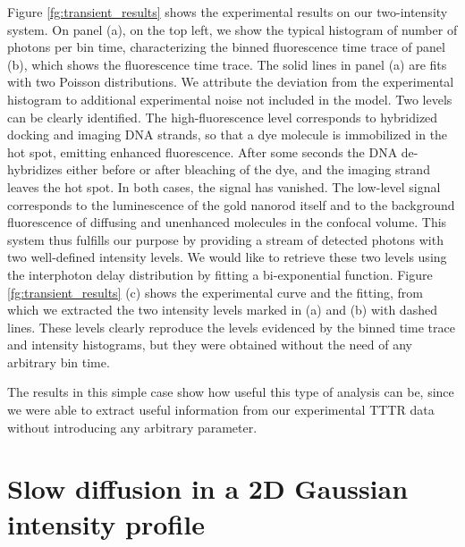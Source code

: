 Figure \ref{fg:transient_results} shows the experimental results
 on our two-intensity system. On panel (a), on the top left, we 
show the typical histogram of number of photons per bin time, 
characterizing the binned fluorescence time trace of panel (b), 
which shows the fluorescence time trace. The solid lines in panel (a) 
are fits with two Poisson distributions. We attribute the deviation 
from the experimental histogram to additional experimental noise not 
included in the model. Two levels can be clearly identified. The high-fluorescence 
level corresponds to hybridized docking and imaging DNA strands, so 
that a dye molecule is immobilized in the hot spot, emitting enhanced 
fluorescence. After some seconds the DNA de-hybridizes either before 
or after bleaching of the dye, and the imaging strand leaves the 
hot spot. In both cases, the signal has vanished. The low-level signal 
corresponds to the luminescence of the 
gold nanorod itself and to the background fluorescence of diffusing
and unenhanced molecules in the confocal volume. This system 
thus fulfills our purpose by providing a stream 
of detected photons with two well-defined intensity levels. 
We would like to retrieve these two levels using the interphoton 
delay distribution by fitting a bi-exponential function. 
Figure \ref{fg:transient_results} (c) shows the experimental curve 
and the fitting, from which we extracted the two intensity levels 
marked in (a) and (b) with dashed lines. These levels clearly 
reproduce the levels evidenced by the binned time trace and intensity 
histograms, but they were obtained without the need of any arbitrary 
bin time. 

The results in this simple case show how useful this type of analysis 
can be, since we were able to extract useful information from our experimental
TTTR data without introducing any arbitrary parameter.


\section{Slow diffusion in a 2D Gaussian intensity profile\label{sec:gaussian2d}}

